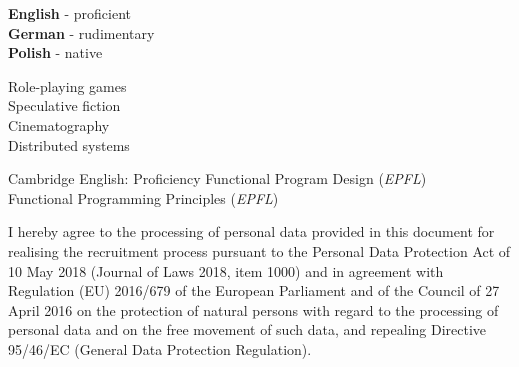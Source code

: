 \documentclass[9pt]{style/developercv}
\begin{document}
\begin{minipage}[t]{0.3\textwidth}
	\vspace{-\baselineskip}


	\textbf{English} - proficient\\
	\textbf{German} - rudimentary\\
	\textbf{Polish} - native
\end{minipage}
\hfill
\begin{minipage}[t]{0.3\textwidth}
	\vspace{-\baselineskip}
	
	
	Role-playing games\\
	Speculative fiction\\
	Cinematography\\
	Distributed systems
\end{minipage}
\hfill
\begin{minipage}[t]{0.3\textwidth}
	\vspace{-\baselineskip}
	
	
	Cambridge English: Proficiency
	Functional Program Design (\textit{EPFL})\\
	Functional Programming Principles (\textit{EPFL})
\end{minipage}


\vspace{1.00cm}

\begin{minipage}[t]{1\textwidth}
	I hereby agree to the processing of personal data provided in this document for 
	realising the recruitment process pursuant to the Personal Data Protection Act
	of 10 May 2018 (Journal of Laws 2018, item 1000) and in agreement with Regulation (EU) 
	2016/679 of the European Parliament and of the Council of 27 April 2016 on the 
	protection of natural persons with regard to the processing of personal data and on 
	the free movement of such data, and repealing Directive 95/46/EC (General Data 
	Protection Regulation).
\end{minipage}
\end{document}

